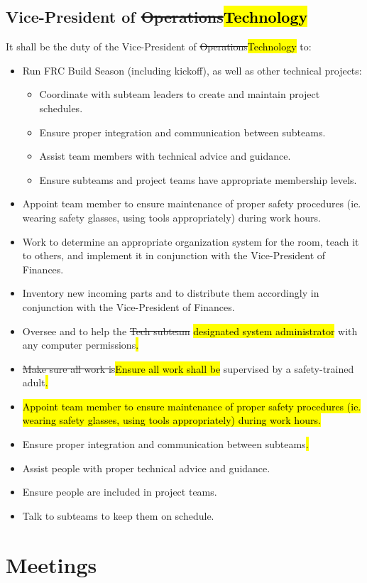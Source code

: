 \documentclass[12pt, a4paper]{article}
\begin{document}
\subsection{Vice-President of \st{Operations}\hl{Technology}}
It shall be the duty of the Vice-President of \st{Operations}\hl{Technology} to:
\begin{itemize}
\item Run FRC Build Season (including kickoff), as well as other technical projects:
	\begin{itemize}
		\item Coordinate with subteam leaders to create and maintain project schedules.
		\item Ensure proper integration and communication between subteams.
		\item Assist team members with technical advice and guidance.
		\item Ensure subteams and project teams have appropriate membership levels.
	\end{itemize}
\item Appoint team member to ensure maintenance of proper safety procedures (ie. wearing safety glasses, using tools appropriately) during work hours.
\item Work to determine an appropriate organization system for the room, teach it to others, and implement it in conjunction with the Vice-President of Finances.
\item Inventory new incoming parts and to distribute them accordingly in conjunction with the Vice-President of Finances.
\item Oversee and to help the \st{Tech subteam} \hl{designated system administrator} with any computer permissions\hl{.}
\item \st{Make sure all work is}\hl{Ensure all work shall be} supervised by a safety-trained adult\hl{.}
\item \hl{Appoint team member to ensure maintenance of proper safety procedures (ie. wearing safety glasses, using tools appropriately) during work hours.}
\item Ensure proper integration and communication between subteams\hl{.}
\item Assist people with proper technical advice and guidance.
\item Ensure people are included in project teams.
\item Talk to subteams to keep them on schedule.
\end{itemize}

\section{Meetings}
\end{document}
